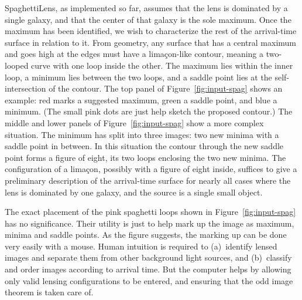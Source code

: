 \documentclass[12pt,preprint]{aastex}
\newcommand{\spl}{SpaghettiLens\xspace}
\newcommand{\figref}[1]{Figure~\ref{fig:#1}}
\newcommand{\Figref}[1]{Figure~\ref{fig:#1}}
\newcommand{\needcite}[1][]{\todo[green]{cit #1}}
\begin{document}
\spl, as implemented so far, assumes that the lens is dominated by a
single galaxy, and that the center of that galaxy is the sole maximum.
Once the maximum has been identified, we wish to characterize the rest
of the arrival-time surface in relation to it.  From geometry, any
surface that has a central maximum and goes high at the edges must
have a lima\c con-like contour, meaning a two-looped curve with one
loop inside the other.  The maximum lies within the inner loop, a
minimum lies between the two loops, and a saddle point lies at the
self-intersection of the contour.  The top panel of
\figref{input-spag} shows an example: red marks a suggested
maximum, green a saddle point, and blue a minimum.  (The small pink
dots are just help sketch the proposed contour.)  The middle and lower
panels of \figref{input-spag} show a more complex situation.
The minimum has split into three images: two new minima with a saddle
point in between.  In this situation the contour through the new
saddle point forms a figure of eight, its two loops enclosing the two
new minima.  The configuration of a lima\c con, possibly with a figure
of eight inside, suffices to give a preliminary description of the
arrival-time surface for nearly all cases where the lens is dominated
by one galaxy, and the source is a single small object.

The exact placement of the pink spaghetti loops shown in
\Figref{input-spag} has no significance.  Their utility is
just to help mark up the image as maximum, minima and saddle points.
As the figure suggests, the marking up can be done very easily with a
mouse.  Human intuition is required to (a)~identify lensed images and
separate them from other background light sources, and (b)~classify
and order images according to arrival time.  But the computer helps by
allowing only valid lensing configurations to be entered, and ensuring
that the odd image theorem is taken care of.%
\end{document}
